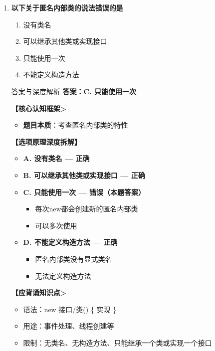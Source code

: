 \documentclass[12pt, a4paper]{ctexart}
\begin{document}
\begin{enumerate}[label=\textbf{\arabic*.}]
	      \vspace{1em}

	\item \textbf{以下关于匿名内部类的说法错误的是}
	      \begin{enumerate}[label=\Alph*.]
		      \item 没有类名
		      \item 可以继承其他类或实现接口
		      \item 只能使用一次
		      \item 不能定义构造方法
	      \end{enumerate}

	      \begin{bluebox}{答案与深度解析}
		      \textbf{答案：C. 只能使用一次}

		      \textbf{【核心认知框架>}
		      \begin{itemize}[leftmargin=*, nosep, label={}]
			      \item \textbf{题目本质}：考查匿名内部类的特性
		      \end{itemize}

		      \textbf{【选项原理深度拆解】}
		      \begin{itemize}[label={}, nosep]
			      \item \textbf{A. 没有类名 — 正确}
			      \item \textbf{B. 可以继承其他类或实现接口 — 正确}
			      \item \textbf{C. 只能使用一次 — 错误（本题答案）}
			      \begin{itemize}[label={}, nosep]
				      \item 每次new都会创建新的匿名内部类
				      \item 可以多次使用
			      \end{itemize}
			      \item \textbf{D. 不能定义构造方法 — 正确}
			      \begin{itemize}[label={}, nosep]
				      \item 匿名内部类没有显式类名
				      \item 无法定义构造方法
			      \end{itemize}
		      \end{itemize}

		      \textbf{【应背诵知识点>}
		      \begin{itemize}[label={}, nosep]
			      \item 语法：new 接口/类() \{ 实现 \}
			      \item 用途：事件处理、线程创建等
			      \item 限制：无类名、无构造方法、只能继承一个类或实现一个接口
		      \end{itemize}
	      \end{bluebox}


\end{enumerate}
\end{document}
